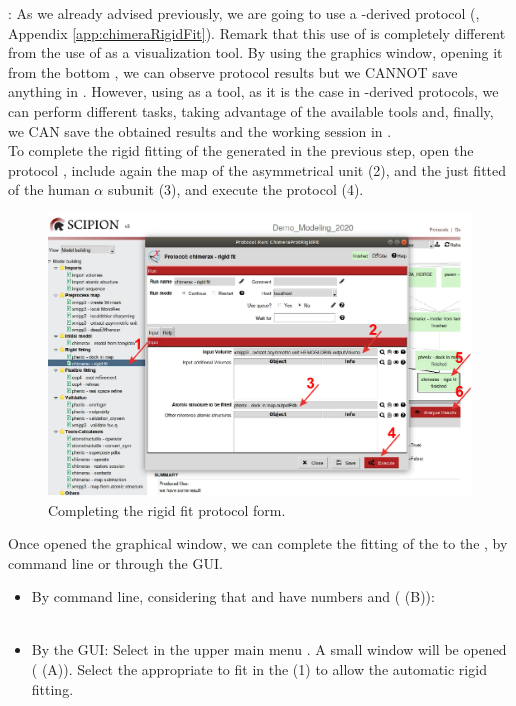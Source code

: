  : As we already advised previously, we are going to use a \chimera-derived protocol (, Appendix \ref{app:chimeraRigidFit}). Remark that this use of \chimera is completely different from the use of \chimera as a visualization tool. By using the \chimera graphics window, opening it from the \scipion bottom , we can observe protocol results but we CANNOT save anything in \scipion. However, using \chimera as a tool, as it is the case in \scipion \chimera-derived protocols, we can perform different tasks, taking advantage of the available \chimera tools and, finally, we CAN save the obtained results and the working session in \scipion.\\  
 
 To complete the rigid fitting of the  generated in the previous step, open the protocol , include again the map of the asymmetrical unit (2), and the just fitted  of the human  $\alpha$ subunit (3), and execute the protocol (4).
 
 \begin{figure}[H]
  \centering 
  \captionsetup{width=.9\linewidth} 
  \includegraphics[width=1\textwidth]{Images/Fig21}
  \caption{Completing the \chimera rigid fit protocol form.}
  \label{fig:chimera_rigid_fit}
  \end{figure}
  
  Once opened the \chimera graphical window, we can complete the fitting of the  to the , by \chimera command line or through the \chimera GUI. 
    \begin{itemize}
     \item By \chimera command line, considering that  and  have  numbers  and  ( (B)):\\
            \\
    \item By the \chimera GUI: Select in the upper main menu . A small window will be opened ( (A)). Select the appropriate  to fit in the   (1) to allow the automatic rigid fitting.
    \end{itemize}

